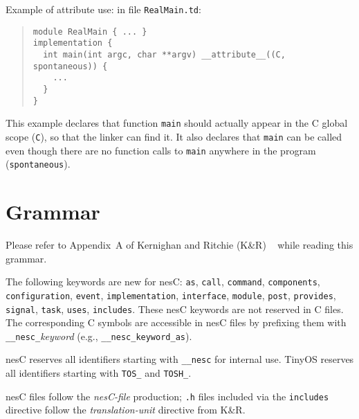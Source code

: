 \documentclass[11pt,letterpaper]{article}
\newcommand{\kw}[1]{{\tt #1}}
\newcommand{\code}[1]{{\tt #1}}
\newcommand{\file}[1]{{\tt #1}}
\newcommand{\nesc}{nesC\xspace}
\newcommand{\tinyos}{TinyOS\xspace}
\begin{document}
Example of attribute use: in file \file{RealMain.td}:
\begin{quote} \begin{verbatim}
module RealMain { ... }
implementation {
  int main(int argc, char **argv) __attribute__((C, spontaneous)) {
    ...
  }
}
\end{verbatim} \end{quote}

This example declares that function \code{main} should actually appear
in the C global scope (\code{C}), so that the linker can find it. It
also declares that \code{main} can be called even though there are no
function calls to \code{main} anywhere in the program
(\code{spontaneous}). 

\appendix

\section{Grammar}
\label{sec:grammar}

Please refer to  Appendix~A of Kernighan and Ritchie (K\&R)
~\cite[pp234--239]{kandr} while reading this grammar.

The following keywords are new for \nesc: \kw{as}, \kw{call}, \kw{command},
\kw{components}, \kw{configuration}, \kw{event}, \kw{implementation},
\kw{interface}, \kw{module}, \kw{post}, \kw{provides}, \kw{signal},
\kw{task}, \kw{uses}, \kw{includes}. These \nesc keywords are not reserved
in C files. The corresponding C symbols are accessible in \nesc files by
prefixing them with \kw{\_\_nesc\_}\emph{keyword} (e.g.,
\kw{\_\_nesc\_keyword\_as}).

\nesc reserves all identifiers starting with \kw{\_\_nesc} for internal
use. \tinyos reserves all identifiers starting with \kw{TOS\_} and
\kw{TOSH\_}.

\nesc files follow the \emph{nesC-file} production; \file{.h} files included
via the \kw{includes} directive follow the \emph{translation-unit}
directive from K\&R. 
\end{document}
